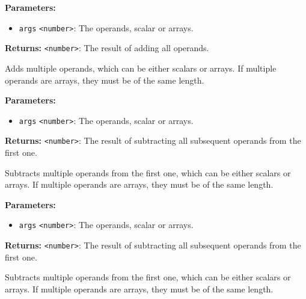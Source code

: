 \documentclass[12pt,a4paper]{article}
\begin{document}
\vspace{5mm}
\noindent {}


\noindent \textbf{Parameters:}
\begin{itemize}
  \item \texttt{args} \texttt{<number>}: The operands, scalar or arrays.
\end{itemize}

\noindent \textbf{Returns:} \texttt{<number>}: The result of adding all operands.

\noindent Adds multiple operands, which can be either scalars or arrays.
If multiple operands are arrays, they must be of the same length.

\vspace{5mm}
\noindent {}


\noindent \textbf{Parameters:}
\begin{itemize}
  \item \texttt{args} \texttt{<number>}: The operands, scalar or arrays.
\end{itemize}

\noindent \textbf{Returns:} \texttt{<number>}: The result of subtracting all subsequent operands from the first one.

\noindent Subtracts multiple operands from the first one, which can be either scalars or arrays.
If multiple operands are arrays, they must be of the same length.

\vspace{5mm}
\noindent {}


\noindent \textbf{Parameters:}
\begin{itemize}
  \item \texttt{args} \texttt{<number>}: The operands, scalar or arrays.
\end{itemize}

\noindent \textbf{Returns:} \texttt{<number>}: The result of subtracting all subsequent operands from the first one.

\noindent Subtracts multiple operands from the first one, which can be either scalars or arrays.
If multiple operands are arrays, they must be of the same length.
\end{document}

